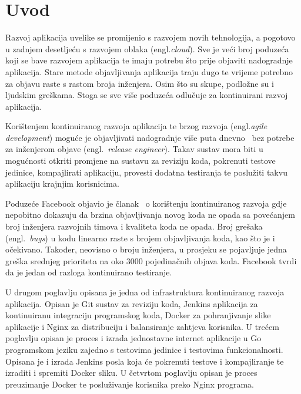 \chapter{Uvod}
Razvoj aplikacija uvelike se promijenio s razvojem novih tehnologija, a pogotovo u zadnjem desetljeću
s razvojem oblaka (engl.\textit{cloud}). Sve je veći broj poduzeća koji se bave razvojem aplikacija
te imaju potrebu što prije objaviti nadogradnje aplikacija. Stare metode objavljivanja aplikacija
traju dugo te vrijeme potrebno za objavu raste s rastom broja inženjera. Osim što su skupe,
podložne su i ljudskim greškama. Stoga se sve više poduzeća odlučuje za kontinuirani razvoj
aplikacija.

Korištenjem kontinuiranog razvoja aplikacija te brzog razvoja (engl.\textit{agile development})
moguće je objavljivati nadogradnje više puta dnevno~\citep{abrahamsson2017agile} bez potrebe za
inženjerom objave (engl.~\textit{release engineer}). Takav sustav mora biti u mogućnosti otkriti
promjene na sustavu za reviziju koda, pokrenuti testove jedinice, kompajlirati aplikaciju, provesti
dodatna testiranja te poslužiti takvu aplikaciju krajnjim korisnicima.

Poduzeće Facebook objavio je članak~\citep{rossi2016continuous} o korištenju kontinuiranog razvoja
gdje nepobitno dokazuju da brzina objavljivanja novog koda ne opada sa povećanjem broj inženjera
razvojnih timova i kvaliteta koda ne opada. Broj grešaka (engl.~\textit{bugs}) u kodu linearno raste
s brojem objavljivanja koda, kao što je i očekivano. Također, neovisno o broju inženjera, u
prosjeku se pojavljuje jedna greška srednjeg prioriteta na oko 3000 pojedinačnih objava koda.
Facebook tvrdi da je jedan od razloga kontinuirano testiranje.

U drugom poglavlju opisana je jedna od infrastruktura kontinuiranog razvoja aplikacija. Opisan je
Git sustav za reviziju koda, Jenkins aplikacija za kontinuiranu integraciju programskog koda,
Docker za pohranjivanje slike aplikacije i Nginx za distribuciju i balansiranje zahtjeva korisnika.
U trećem poglavlju opisan je proces i izrada jednostavne internet aplikacije u Go programskom jeziku
zajedno s testovima jedinice i testovima funkcionalnosti. Opisana je i izrada Jenkins posla koja će
pokrenuti testove i kompajliranje te izraditi i spremiti Docker sliku. U četvrtom poglavlju opisan
je proces preuzimanje Docker te posluživanje korisnika preko Nginx programa.

